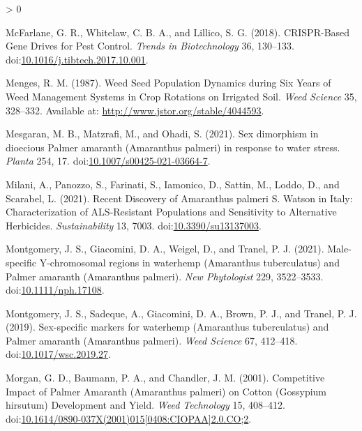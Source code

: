 \documentclass[utf8]{frontiersSCNS}
\newlength{\cslhangindent}
\newenvironment{CSLReferences}[2] %
 {%
  \setlength{\parindent}{0pt}
  \ifodd #1 \everypar{\setlength{\hangindent}{\cslhangindent}}\ignorespaces\fi
  \ifnum #2 > 0
  \setlength{\parskip}{#2\baselineskip}
  \fi
 }%
 {}
\begin{document}
\begin{CSLReferences}{1}{0}
\leavevmode\hypertarget{ref-mcfarlane2018}{}%
McFarlane, G. R., Whitelaw, C. B. A., and Lillico, S. G. (2018).
{CRISPR}-{Based Gene Drives} for {Pest Control}. \emph{Trends in
Biotechnology} 36, 130--133.
doi:\href{https://doi.org/10.1016/j.tibtech.2017.10.001}{10.1016/j.tibtech.2017.10.001}.

\leavevmode\hypertarget{ref-menges1987}{}%
Menges, R. M. (1987). Weed {Seed Population Dynamics} during {Six Years}
of {Weed Management Systems} in {Crop Rotations} on {Irrigated Soil}.
\emph{Weed Science} 35, 328--332. Available at:
\url{http://www.jstor.org/stable/4044593}.

\leavevmode\hypertarget{ref-mesgaran2021}{}%
Mesgaran, M. B., Matzrafi, M., and Ohadi, S. (2021). Sex dimorphism in
dioecious {Palmer} amaranth ({Amaranthus} palmeri) in response to water
stress. \emph{Planta} 254, 17.
doi:\href{https://doi.org/10.1007/s00425-021-03664-7}{10.1007/s00425-021-03664-7}.

\leavevmode\hypertarget{ref-milani2021}{}%
Milani, A., Panozzo, S., Farinati, S., Iamonico, D., Sattin, M., Loddo,
D., and Scarabel, L. (2021). Recent {Discovery} of {Amaranthus} palmeri
{S}. {Watson} in {Italy}: {Characterization} of {ALS}-{Resistant
Populations} and {Sensitivity} to {Alternative Herbicides}.
\emph{Sustainability} 13, 7003.
doi:\href{https://doi.org/10.3390/su13137003}{10.3390/su13137003}.

\leavevmode\hypertarget{ref-montgomery2021}{}%
Montgomery, J. S., Giacomini, D. A., Weigel, D., and Tranel, P. J.
(2021). Male-specific {Y}-chromosomal regions in waterhemp ({Amaranthus}
tuberculatus) and {Palmer} amaranth ({Amaranthus} palmeri). \emph{New
Phytologist} 229, 3522--3533.
doi:\href{https://doi.org/10.1111/nph.17108}{10.1111/nph.17108}.

\leavevmode\hypertarget{ref-montgomery2019}{}%
Montgomery, J. S., Sadeque, A., Giacomini, D. A., Brown, P. J., and
Tranel, P. J. (2019). Sex-specific markers for waterhemp ({Amaranthus}
tuberculatus) and {Palmer} amaranth ({Amaranthus} palmeri). \emph{Weed
Science} 67, 412--418.
doi:\href{https://doi.org/10.1017/wsc.2019.27}{10.1017/wsc.2019.27}.

\leavevmode\hypertarget{ref-morgan2001}{}%
Morgan, G. D., Baumann, P. A., and Chandler, J. M. (2001). Competitive
{Impact} of {Palmer Amaranth} ({Amaranthus} palmeri) on {Cotton}
({Gossypium} hirsutum) {Development} and {Yield}. \emph{Weed Technology}
15, 408--412.
doi:\href{https://doi.org/10.1614/0890-037X(2001)015\%5B0408:CIOPAA\%5D2.0.CO;2}{10.1614/0890-037X(2001)015{[}0408:CIOPAA{]}2.0.CO;2}.


\end{CSLReferences}
\end{document}
